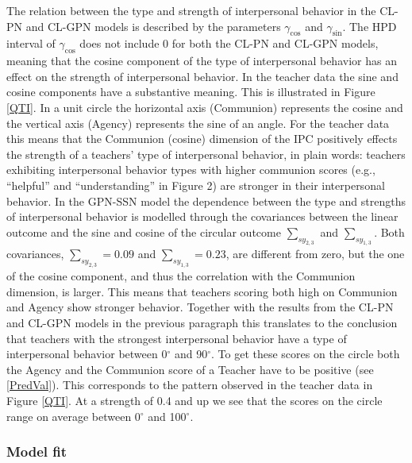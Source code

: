\documentclass[man,mask]{apa6}
\begin{document}
The relation between the type and strength of interpersonal behavior in the
CL-PN and CL-GPN models is described by the parameters \(\gamma_{\cos}\) and
\(\gamma_{\sin}\). The HPD interval of \(\gamma_{\cos}\) does not include 0 for
both the CL-PN and CL-GPN models, meaning that the cosine component of the type
of interpersonal behavior has an effect on the strength of interpersonal
behavior.\newline
\indent In the teacher data the sine and cosine components have a substantive
meaning. This is illustrated in Figure \ref{QTI}. In a unit circle the
horizontal axis (Communion) represents the cosine and the vertical axis
(Agency) represents the sine of an angle. For the teacher data this means that
the Communion (cosine) dimension of the IPC positively effects the strength of a
teachers' type of interpersonal behavior, in plain words: teachers exhibiting
interpersonal behavior types with higher communion scores (e.g., \enquote{helpful} and
\enquote{understanding} in Figure 2) are stronger in their interpersonal behavior.\newline 
\indent In the GPN-SSN model the dependence between the type and strengths of
interpersonal behavior is modelled through the covariances between the linear
outcome and the sine and cosine of the circular outcome \(\sum_{sy_{2,3}}\) and
\(\sum_{sy_{1,3}}\). Both covariances, \(\sum_{sy_{2,3}} = 0.09\) and
\(\sum_{sy_{1,3}} = 0.23\), are different from zero, but the one of the cosine
component, and thus the correlation with the Communion dimension, is larger.
This means that teachers scoring both high on Communion and Agency show stronger
behavior. Together with the results from the CL-PN and CL-GPN models in the
previous paragraph this translates to the conclusion that teachers with the
strongest interpersonal behavior have a type of interpersonal behavior between
0\(^\circ\) and 90\(^\circ\). To get these scores on the circle both the Agency and
the Communion score of a Teacher have to be positive (see \eqref{PredVal}). This
corresponds to the pattern observed in the teacher data in Figure \ref{QTI}. At
a strength of 0.4 and up we see that the scores on the circle range on average
between 0\(^\circ\) and 100\(^\circ\).

\vspace{-0.5cm}
\subsubsection{Model fit}
\end{document}
